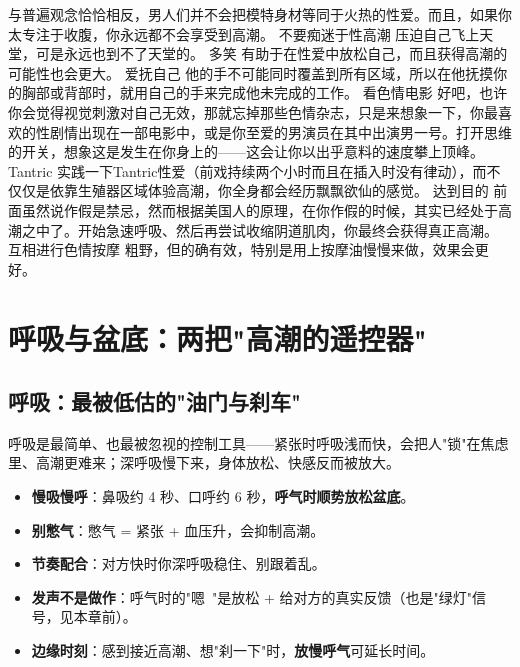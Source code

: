 \documentclass[12pt,UTF8,openany]{ctexbook}
\begin{document}
与普遍观念恰恰相反，男人们并不会把模特身材等同于火热的性爱。而且，如果你太专注于收腹，你永远都不会享受到高潮。
不要痴迷于性高潮
压迫自己飞上天堂，可是永远也到不了天堂的。
多笑
有助于在性爱中放松自己，而且获得高潮的可能性也会更大。
爱抚自己
他的手不可能同时覆盖到所有区域，所以在他抚摸你的胸部或背部时，就用自己的手来完成他未完成的工作。
看色情电影
好吧，也许你会觉得视觉刺激对自己无效，那就忘掉那些色情杂志，只是来想象一下，你最喜欢的性剧情出现在一部电影中，或是你至爱的男演员在其中出演男一号。打开思维的开关，想象这是发生在你身上的——这会让你以出乎意料的速度攀上顶峰。
Tantric
实践一下Tantric性爱（前戏持续两个小时而且在插入时没有律动），而不仅仅是依靠生殖器区域体验高潮，你全身都会经历飘飘欲仙的感觉。
达到目的
前面虽然说作假是禁忌，然而根据美国人的原理，在你作假的时候，其实已经处于高潮之中了。开始急速呼吸、然后再尝试收缩阴道肌肉，你最终会获得真正高潮。
互相进行色情按摩
粗野，但的确有效，特别是用上按摩油慢慢来做，效果会更好。

\section{呼吸与盆底：两把"高潮的遥控器"}

\subsection*{呼吸：最被低估的"油门与刹车"}
呼吸是最简单、也最被忽视的控制工具——紧张时呼吸浅而快，会把人"锁"在焦虑里、高潮更难来；深呼吸慢下来，身体放松、快感反而被放大。
\begin{itemize}[leftmargin=2em,itemsep=0.2em]
  \item \textbf{慢吸慢呼}：鼻吸约 4 秒、口呼约 6 秒，\textbf{呼气时顺势放松盆底}。
  \item \textbf{别憋气}：憋气 = 紧张 + 血压升，会抑制高潮。
  \item \textbf{节奏配合}：对方快时你深呼吸稳住、别跟着乱。
  \item \textbf{发声不是做作}：呼气时的"嗯~"是放松 + 给对方的真实反馈（也是"绿灯"信号，见本章前）。
  \item \textbf{边缘时刻}：感到接近高潮、想"刹一下"时，\textbf{放慢呼气}可延长时间。
\end{itemize}
\end{document}

